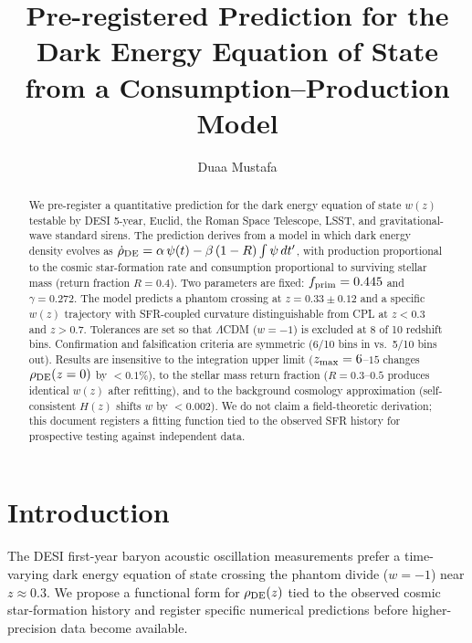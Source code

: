 \documentclass[12pt,preprint]{aastex631}
\begin{document}
\title{Pre-registered Prediction for the Dark Energy Equation of State\\from a Consumption--Production Model}

\author{Duaa Mustafa}

\begin{abstract}
We pre-register a quantitative prediction for the dark energy equation of state $w(z)$ testable by DESI 5-year, Euclid, the Roman Space Telescope, LSST, and gravitational-wave standard sirens. The prediction derives from a model in which dark energy density evolves as $\dot{\rho}_{\rm DE} = \alpha\,\psi(t) - \beta\,(1-R)\int\psi\,dt'$, with production proportional to the cosmic star-formation rate and consumption proportional to surviving stellar mass (return fraction $R = 0.4$). Two parameters are fixed: $f_{\rm prim} = 0.445$ and $\gamma = 0.272$. The model predicts a phantom crossing at $z = 0.33 \pm 0.12$ and a specific $w(z)$ trajectory with SFR-coupled curvature distinguishable from CPL at $z < 0.3$ and $z > 0.7$. Tolerances are set so that $\Lambda$CDM ($w = -1$) is excluded at 8 of 10 redshift bins. Confirmation and falsification criteria are symmetric (6/10 bins in vs.\ 5/10 bins out). Results are insensitive to the integration upper limit ($z_{\rm max} = 6$--$15$ changes $\rho_{\rm DE}(z=0)$ by $< 0.1\%$), to the stellar mass return fraction ($R = 0.3$--$0.5$ produces identical $w(z)$ after refitting), and to the background cosmology approximation (self-consistent $H(z)$ shifts $w$ by $< 0.002$). We do not claim a field-theoretic derivation; this document registers a fitting function tied to the observed SFR history for prospective testing against independent data.
\end{abstract}


\section{Introduction}

The DESI first-year baryon acoustic oscillation measurements \citep{DESI2024} prefer a time-varying dark energy equation of state crossing the phantom divide ($w = -1$) near $z \approx 0.3$. We propose a functional form for $\rho_{\rm DE}(z)$ tied to the observed cosmic star-formation history \citep{MadauDickinson2014} and register specific numerical predictions before higher-precision data become available.
\end{document}
